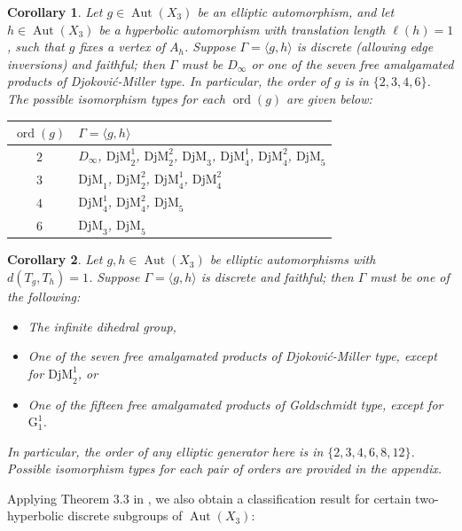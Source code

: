 \documentclass[12pt,leqno]{amsart}
\newcommand{\2}{L^2_{\rm per}(0, T)}
\newtheorem{cor}{Corollary}[section]
\newcommand{\aut}{{\operatorname{Aut}}}
\newcommand{\ord}{{\operatorname{ord}}}
\numberwithin{equation}{section}
\numberwithin{figure}{section}
\begin{document}
\begin{cor}\label{cor:translation_1}
    Let $g\in\aut(X_3)$ be an elliptic automorphism, and let $h\in \aut(X_3)$ be a hyperbolic automorphism with translation length $\ell(h) = 1$, such that $g$ fixes a vertex of $A_h$. Suppose $\Gamma = \langle g,h\rangle$ is discrete (allowing edge inversions) and faithful; then $\Gamma$ must be $D_\infty$ or one of the seven free amalgamated products of Djokovi\'c-Miller type. In particular, the order of $g$ is in $\{2,3,4,6\}$. The possible isomorphism types for each $\ord(g)$ are given below:
    \begin{center}
        \begin{tabular}{c|p{12cm}}
            $\ord(g)$ & $\Gamma = \langle g,h\rangle$ \\
            \hline
            $2$ & $D_\infty$, $\mathrm{DjM}_2^1$, $\mathrm{DjM}_2^2$, $\mathrm{DjM}_3$, $\mathrm{DjM}_4^1$, $\mathrm{DjM}_4^2$, $\mathrm{DjM}_5$\\
            \hline
            $3$ & $\mathrm{DjM}_1$, $\mathrm{DjM}_2^2$, $\mathrm{DjM}_4^1$, $\mathrm{DjM}_4^2$\\
            \hline
            $4$ & $\mathrm{DjM}_4^1$, $\mathrm{DjM}_4^2$, $\mathrm{DjM}_5$\\
            \hline
            $6$ & $\mathrm{DjM}_3$, $\mathrm{DjM}_5$ \\
        \end{tabular}
    \end{center}
\end{cor}
\begin{cor}\label{cor:two_ellip}
    Let $g,h\in\aut(X_3)$ be elliptic automorphisms with $d(T_g,T_h) = 1$. Suppose $\Gamma = \langle g,h\rangle$ is discrete and faithful; then $\Gamma$ must be one of the following:
    \begin{itemize}
        \item The infinite dihedral group,
        \item One of the seven free amalgamated products of Djokovi\'c-Miller type, except for $\mathrm{DjM}_2^1$, or
        \item One of the fifteen free amalgamated products of Goldschmidt type, except for $\mathrm{G}_1^1$.
    \end{itemize}
    In particular, the order of any elliptic generator here is in $\{2,3,4,6,8,12\}$. Possible isomorphism types for each pair of orders are provided in the appendix.
\end{cor}
Applying Theorem 3.3 in \cite{Du_Hersonsky_Tree_Aut}, we also obtain a classification result for certain two-hyperbolic discrete subgroups of $\aut(X_3)$:
\end{document}
